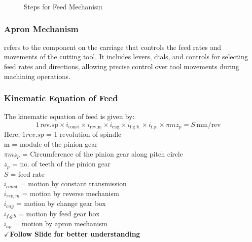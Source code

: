 \documentclass{article}
\begin{document}
\begin{figure}
 
  \caption{Steps for Feed Mechanism} 
\end{figure}

\subsubsection*{Apron Mechanism}
refers to the component on the carriage that controls the feed rates and movements of the cutting tool. It includes levers, dials, and controls for selecting feed rates and directions, allowing precise control over tool movements during machining operations.


\subsubsection*{Kinematic Equation of Feed}
The kinematic equation of feed is given by:
\[1 \, \text{rev.sp} \times i_{\text{const}} \times i_{\text{rev,m}} \times i_{\text{cng}} \times i_{\text{f.g.b.}} \times i_{\text{i.p.}} \times \pi m z_p = S \, \text{mm/rev}\]
Here, $1 rev.sp$ = 1 revolution of spindle \\
m = module of the pinion gear \\
$\pi m z_p$ = Circumference of the pinion gear along pitch circle \\
$z_p$ = no. of teeth of the pinion gear \\
$S$ = feed rate \\ 
$i_{const}$ = motion by constant transmission \\
$i_{rev,m}$ = motion by reverse mechanism \\
$i_{cng}$ = motion by change gear box \\
$i_{f.g.b}$ = motion by feed gear box \\
$i_{ap}$ = motion by apron mechanism \\


$\checkmark $\textbf{Follow Slide for better understanding}
\end{document}
